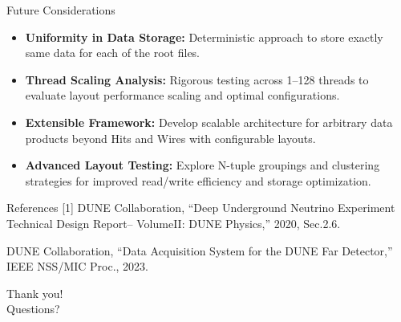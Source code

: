 \documentclass[aspectratio=169]{beamer}
\begin{document}
\begin{frame}{Future Considerations}
\begin{itemize}

  \item \textbf{Uniformity in Data Storage:} Deterministic approach to store exactly same data for each of the root files.

  \vspace{0.5em}

  \item \textbf{Thread Scaling Analysis:} Rigorous testing across 1--128 threads to evaluate layout performance scaling and optimal configurations.
  
  \vspace{0.5em}
  
  \item \textbf{Extensible Framework:} Develop scalable architecture for arbitrary data products beyond Hits and Wires with configurable layouts.
  
  \vspace{0.5em}
  
  \item \textbf{Advanced Layout Testing:} Explore N-tuple groupings and clustering strategies for improved read/write efficiency and storage optimization.
\end{itemize}
\end{frame}

\begin{frame}[allowframebreaks]{References}
\small
[1] DUNE Collaboration, “Deep Underground Neutrino Experiment Technical Design Report– VolumeII: DUNE Physics,” 2020, Sec.2.6.\par
[2] DUNE Collaboration, “Data Acquisition System for the DUNE Far Detector,” IEEE NSS/MIC Proc., 2023.\\
\end{frame}

\begin{frame}[standout]
Thank you! \\
Questions?
\end{frame}
\end{document}

